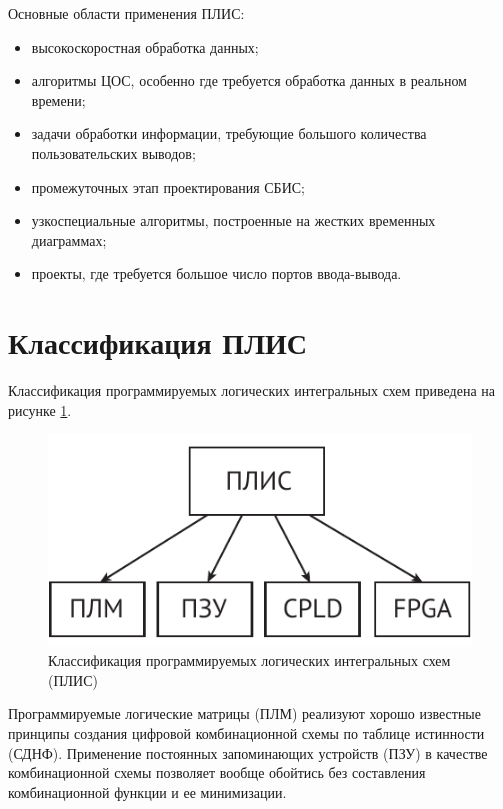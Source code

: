 Основные области применения ПЛИС:
\begin{itemize}
    \item высокоскоростная обработка данных;
    \item алгоритмы ЦОС, особенно где требуется обработка данных в реальном
    времени;
    \item задачи обработки информации, требующие большого количества
    пользовательских выводов;
    \item промежуточных этап проектирования СБИС;
    \item узкоспециальные алгоритмы, построенные на жестких временных
    диаграммах;
    \item проекты, где требуется большое число портов ввода-вывода.
\end{itemize}

\vspace*{2em} %

\section{Классификация ПЛИС}

 Классификация программируемых логических интегральных схем
приведена на рисунке \ref{pic_1}.
\begin{figure}[h!]
    \centering
    \includegraphics[width=.6\textwidth]{pld_01}
    \caption{Классификация программируемых логических интегральных схем (ПЛИС)}
    \label{pic_1}
\end{figure}

Программируемые логические матрицы (ПЛМ) реализуют хорошо известные принципы
создания цифровой комбинационной схемы по таблице истинности (СДНФ). Применение
постоянных запоминающих устройств (ПЗУ) в качестве комбинационной схемы
позволяет вообще обойтись без составления комбинационной функции и ее
минимизации.

